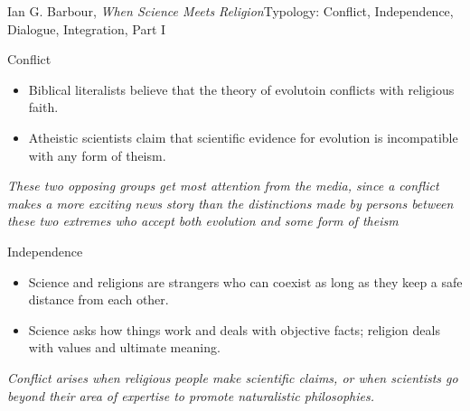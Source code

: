 \documentclass[10pt, dvipdfmx]{beamer}
\begin{document}
\begin{frame}{Ian G. Barbour, {\it When Science Meets Religion}}{Typology: Conflict, Independence, Dialogue, Integration, Part I}

\begin{block}{Conflict}
\begin{itemize}
\item Biblical literalists believe that the theory of evolutoin conflicts with religious faith.
\item Atheistic scientists claim that scientific evidence for evolution is incompatible with any form of theism.
\end{itemize}
{\it These two opposing groups get most attention from the media, since a conflict makes a more exciting news story than the distinctions made by persons between these two extremes who accept both evolution and some form of theism}
\end{block}

\begin{block}{Independence}
\begin{itemize}
\item Science and religions are strangers who can coexist as long as they keep a safe distance from each other.
\item Science asks how things work and deals with objective facts; religion deals with values and ultimate meaning.
\end{itemize}
{\it Conflict arises when religious people make scientific claims, or when scientists go beyond their area of expertise to promote naturalistic philosophies.}
\end{block}


\end{frame}
\end{document}
